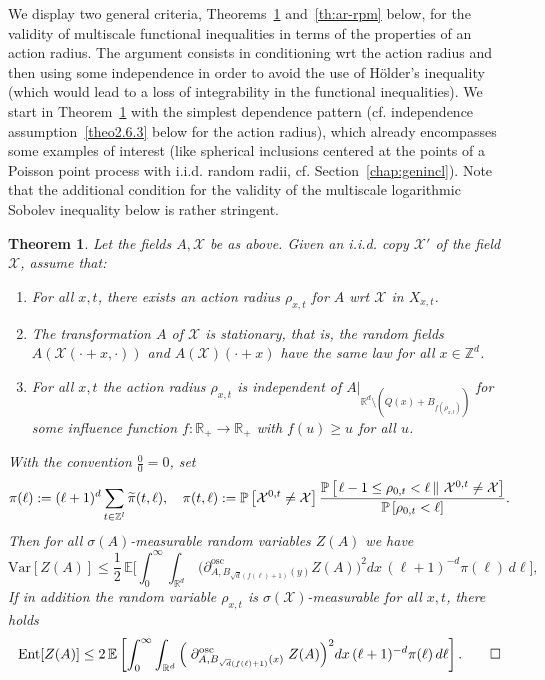\documentclass[11pt]{article}
\newtheorem{theo}{Theorem}[section]
\theoremstyle{definition}
\numberwithin{equation}{section}
\numberwithin{figure}{section}
\numberwithin{table}{section}
\newcommand{\R}{\mathbb R}
\newcommand{\Z}{\mathbb Z}
\newcommand{\expecM}[1]{\mathbb{E}\bigg[#1 \bigg]}
\newcommand{\expec}[1]{\mathbb{E}\left[#1 \right]}
\newcommand{\pr}[1]{\mathbb{P}\left[#1 \right]}
\newcommand{\prC}[2]{\mathbb{P}\left[\left. #1 \,\right\|\,#2\right]}
\newcommand{\X}{\mathcal X}
\newcommand{\osc}{\partial^{\mathrm{osc}}}
\newcommand{\oscd}[1]{\mathrel{\osc_{#1}}}
\newcommand{\var}[1]{\mathrm{Var}\left[#1\right]}
\newcommand{\ent}[1]{\mathrm{Ent}\!\left[#1\right]}
\newcommand*{\alphenumi}{\renewcommand*{\theenumi}{\alph{enumi}}}
\let\oldtilde\tilde
\renewcommand*{\tilde}[1]{\mathchoice{\widetilde{#1}}{\widetilde{#1}}{\oldtilde{#1}}{\oldtilde{#1}}}\let\oldhat\hat
\renewcommand*{\hat}[1]{\mathchoice{\widehat{#1}}{\widehat{#1}}{\oldhat{#1}}{\oldhat{#1}}}\let\oldexists\exists
\renewcommand*{\exists}{\mathrel{\oldexists}}
\begin{document}
We display two general criteria, Theorems~\ref{th:ar} and~\ref{th:ar-rpm} below, for the validity of multiscale functional inequalities in terms of the properties of an action radius. The argument consists in conditioning wrt the action radius and then using some independence in order to avoid the use of H\"older's inequality (which would lead to a loss of integrability in the functional inequalities). We start in Theorem~\ref{th:ar} with the simplest dependence pattern (cf. independence assumption~\eqref{theo2.6.3} below for the action radius), which already encompasses some examples of interest (like spherical inclusions centered at the points of a Poisson point process with i.i.d. random radii, cf. Section~\ref{chap:genincl}). Note that the additional condition for the validity of the multiscale logarithmic Sobolev inequality below is rather stringent.
\begin{theo}\label{th:ar}
Let the fields $A,\X$ be as above. Given an i.i.d. copy $\X'$ of the field $\X$, assume that:
\begin{enumerate} \alphenumi 
\item \label{theo2.6.1}For all $x,t$, there exists an action radius $\rho_{x,t}$ for $A$ wrt $\X$ in $X_{x,t}$.
\item \label{theo2.6.2}The transformation $A$ of $\X$ is stationary, that is, the random fields\linebreak $A(\X(\cdot+x,\cdot))$ and $A(\X)(\cdot+x)$ have the same law for all $x\in\Z^d$.
\item \label{theo2.6.3}For all $x,t$ the action radius $\rho_{x,t}$ is independent of $A|_{\R^d\setminus (Q(x)+B_{f(\rho_{x,t})})}$ for some \emph{influence function} $f:\R_+\to\R_+$ with $f(u)\ge u$ for all $u$.
\end{enumerate}
With the convention $\frac00=0$, set
\[
\pi(\ell):=(\ell+1)^{d}\sum_{t\in\Z^l}\tilde\pi(t,\ell),\quad
\pi(t,\ell):=\pr{\X^{0,t}\ne \X}\frac{\prC{\ell-1\le\rho_{0,t}<\ell}{\X^{0,t}\ne \X}}{\pr{\rho_{0,t}<\ell}}.
\]
Then for all $\sigma(A)$-measurable random variables $Z(A)$ we have
\begin{equation}\label{eq:arwsg2}
\var{Z(A)}\le\frac12\,\expecM{\int_0^\infty\int_{\R^d}\,\Big(\oscd{A,B_{\sqrt d(f(\ell)+1)}(y)}Z(A)\Big)^2dx\,(\ell+1)^{-d} \pi(\ell)\,d\ell},
\end{equation}
If in addition the random variable $\rho_{x,t}$ is $\sigma(\X)$-measurable for all $x,t$, there holds
\begin{equation}
\ent{Z(A)}\le2\,\expec{ \int_{0}^\infty \int_{\R^d}\Big(\oscd{A,B_{\sqrt{d}(f(\ell)+1)}(x)}Z(A)\Big)^2dx\,(\ell+1)^{-d}\pi(\ell)\,d\ell}.\label{eq:arlsi2}
\qedhere
\end{equation}

\end{theo}
\end{document}
